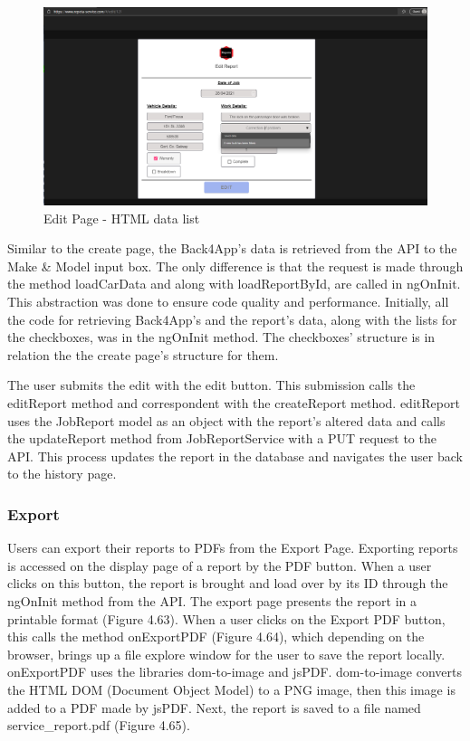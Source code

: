 \begin{figure}[H]
    \centering
    \caption{Edit Page - HTML data list}
    \label{image:EditHTMLdatalist}
    \includegraphics[width=1.0\textwidth]{images/repota/UI/edit-page.png}
\end{figure}

Similar to the create page, the Back4App's data is retrieved from the API to the Make \& Model input box. The only difference is that the request is made through the method loadCarData and along with loadReportById, are called in ngOnInit. This abstraction was done to ensure code quality and performance. Initially, all the code for retrieving Back4App's and the report's data, along with the lists for the checkboxes, was in the ngOnInit method. The checkboxes' structure is in relation the the create page's structure for them.

The user submits the edit with the edit button. This submission calls the editReport method and correspondent with the createReport method. editReport uses the JobReport model as an object with the report's altered data and calls the updateReport method from JobReportService with a PUT request to the API. This process updates the report in the database and navigates the user back to the history page.

\subsubsection{Export}
Users can export their reports to PDFs from the Export Page. Exporting reports is accessed on the display page of a report by the PDF button. When a user clicks on this button, the report is brought and load over by its ID through the ngOnInit method from the API. The export page presents the report in a printable format (Figure 4.63). When a user clicks on the Export PDF button, this calls the method onExportPDF (Figure 4.64), which depending on the browser, brings up a file explore window for the user to save the report locally. onExportPDF uses the libraries dom-to-image and jsPDF. dom-to-image converts the HTML DOM (Document Object Model) to a PNG image, then this image is added to a PDF made by jsPDF. Next, the report is saved to a file named service\_report.pdf (Figure 4.65).

